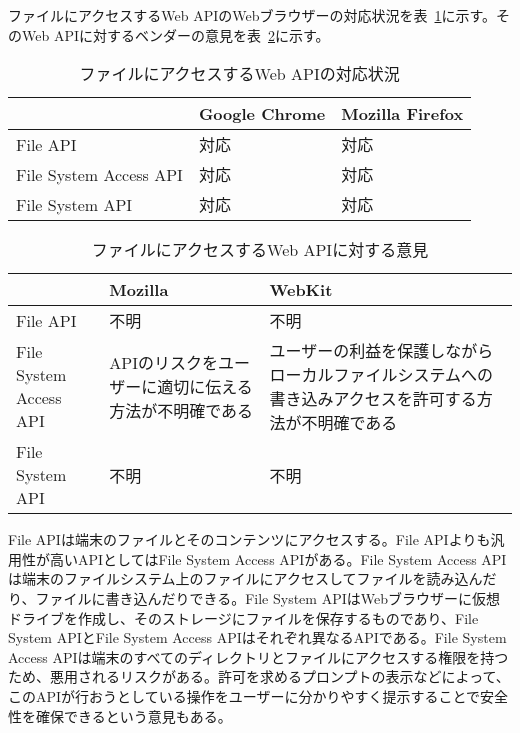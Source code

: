 ファイルにアクセスするWeb APIのWebブラウザーの対応状況を表~\ref{table:ファイルにアクセスするWeb APIの対応状況}に示す。そのWeb APIに対するベンダーの意見を表~\ref{table:ファイルにアクセスするWeb APIに対する意見}に示す。
\begin{table}
  \caption{ファイルにアクセスするWeb APIの対応状況}\label{table:ファイルにアクセスするWeb APIの対応状況}
  \centering
  \begin{tabular}{|p{13em}|p{8em}|p{8em}|}
    \hline
    & Google Chrome & Mozilla Firefox \\ \hline
    File API & \cellcolor{gray!10}対応 & \cellcolor{gray!10}対応 \\ \hline
    File System Access API & \cellcolor{gray!10}対応 & \cellcolor{gray!10}対応 \\ \hline
    File System API & \cellcolor{gray!10}対応 & \cellcolor{gray!10}対応 \\ \hline
  \end{tabular}
\end{table}
\begin{table}
  \caption{ファイルにアクセスするWeb APIに対する意見}
  \label{table:ファイルにアクセスするWeb APIに対する意見}
    \centering
    \begin{tabular}{|p{13em}|p{13em}|p{13em}|}
        \hline
        & Mozilla & WebKit \\ \hline
        File API & 不明 & 不明 \\ \hline
        File System Access API & \cellcolor{gray!30}APIのリスクをユーザーに適切に伝える方法が不明確である\cite{MozillaFileSystemAccessAPI} & \cellcolor{gray!30}ユーザーの利益を保護しながらローカルファイルシステムへの書き込みアクセスを許可する方法が不明確である~\cite{WebKitFileSystemAccessAPI} \\ \hline
        File System API & 不明 & 不明\\ \hline
    \end{tabular}
\end{table}
File APIは端末のファイルとそのコンテンツにアクセスする。File APIよりも汎用性が高いAPIとしてはFile System Access APIがある。File System Access APIは端末のファイルシステム上のファイルにアクセスしてファイルを読み込んだり、ファイルに書き込んだりできる。File System APIはWebブラウザーに仮想ドライブを作成し、そのストレージにファイルを保存するものであり、File System APIとFile System Access APIはそれぞれ異なるAPIである。File System Access APIは端末のすべてのディレクトリとファイルにアクセスする権限を持つため、悪用されるリスクがある。許可を求めるプロンプトの表示などによって、このAPIが行おうとしている操作をユーザーに分かりやすく提示することで安全性を確保できるという意見もある。

